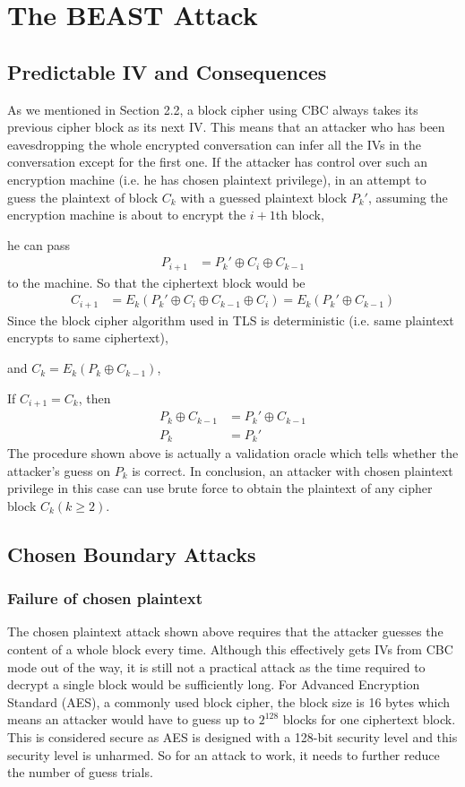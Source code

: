 \documentclass{acm_proc_article-sp}
\begin{document}
\section{The BEAST Attack}
\subsection{Predictable IV and Consequences}
As we mentioned in Section 2.2, a block cipher using CBC always takes its previous cipher block as
its next IV. This means that an attacker who has been eavesdropping the whole encrypted
conversation can infer all the IVs in the conversation except for the first one.
If the attacker has control over such an encryption machine (i.e. he has chosen plaintext privilege),
in an attempt to guess the plaintext of block $C_k$ with a guessed plaintext block $P_k'$,
assuming the encryption machine is about to encrypt the $i+1$th block,

he can pass
$$
\begin{aligned}
P_{i+1}&=P_k'\oplus C_i\oplus C_{k-1}
\end{aligned}
$$
to the machine. So that the ciphertext block would be
$$
\begin{aligned}
C_{i+1}&=E_k(P_k'\oplus C_i\oplus C_{k-1}\oplus C_i)=E_k(P_k'\oplus C_{k-1})
\end{aligned}
$$
Since the block cipher algorithm used in TLS is deterministic
(i.e. same plaintext encrypts to same ciphertext),

and $C_k = E_k(P_k\oplus C_{k-1})$,

If $C_{i+1} = C_k$, then
$$
\begin{aligned}
P_k\oplus C_{k-1}&= P_k'\oplus C_{k-1}\\
P_k&= P_k'
\end{aligned}
$$
The procedure shown above is actually a validation oracle which tells whether the attacker's guess
on $P_k$ is correct. In conclusion, an attacker with chosen plaintext privilege in this case can use
brute force to obtain the plaintext of any cipher block $C_k(k\geq 2)$.
\subsection{Chosen Boundary Attacks}
\subsubsection{Failure of chosen plaintext}
The chosen plaintext attack shown above requires that the attacker guesses the content of a whole
block every time. Although this effectively gets IVs from CBC mode out of the way, it is still not a
practical attack as the time required to decrypt a single block would be sufficiently long.
For Advanced Encryption Standard (AES), a commonly used block cipher,
the block size is 16 bytes\cite{aes} which means an attacker would have to guess up to $2^{128}$
blocks for one ciphertext block.
This is considered secure as AES is designed with a 128-bit security level\cite{seclv} and this
security level is unharmed. So for an attack to work, it needs to further reduce the number of guess
trials.
\end{document}
